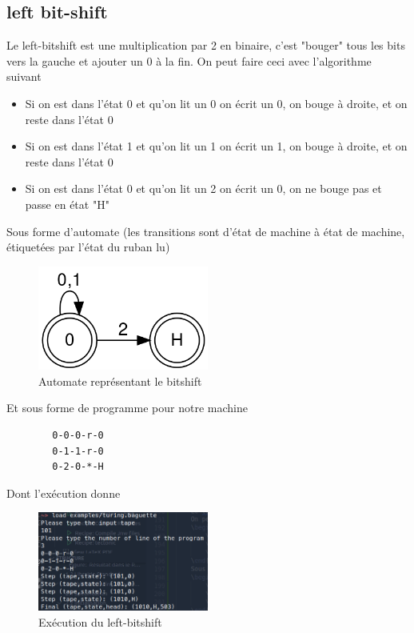 \documentclass[11pt,colorlinks=true,a4paper]{article}
\begin{document}
    \subsection{left bit-shift}
    Le left-bitshift est une multiplication par 2 en binaire, c'est "bouger" tous les bits vers la gauche et ajouter un 0 à la fin.
    On peut faire ceci avec l'algorithme suivant 
    \begin{itemize}
        \item Si on est dans l'état 0 et qu'on lit un 0 on écrit un 0, on bouge à droite, et on reste dans l'état 0
        \item Si on est dans l'état 1 et qu'on lit un 1 on écrit un 1, on bouge à droite, et on reste dans l'état 0
        \item Si on est dans l'état 0 et qu'on lit un 2 on écrit un 0, on ne bouge pas et passe en état "H"
    \end{itemize}
    Sous forme d'automate (les transitions sont d'état de machine à état de machine, étiquetées par l'état du ruban lu)
    \begin{figure}[H]
        \center 
        \includegraphics[width=0.5\textwidth]{img/automata1.png}
        \caption{Automate représentant le bitshift}
    \end{figure}
    Et sous forme de programme pour notre machine
    \begin{lstlisting}
        0-0-0-r-0
        0-1-1-r-0
        0-2-0-*-H
    \end{lstlisting}
    Dont l'exécution donne
    \begin{figure}[H]
        \center 
        \includegraphics[width=0.5\textwidth]{img/bitshift.png}
        \caption{Exécution du left-bitshift}
    \end{figure}
\end{document}
